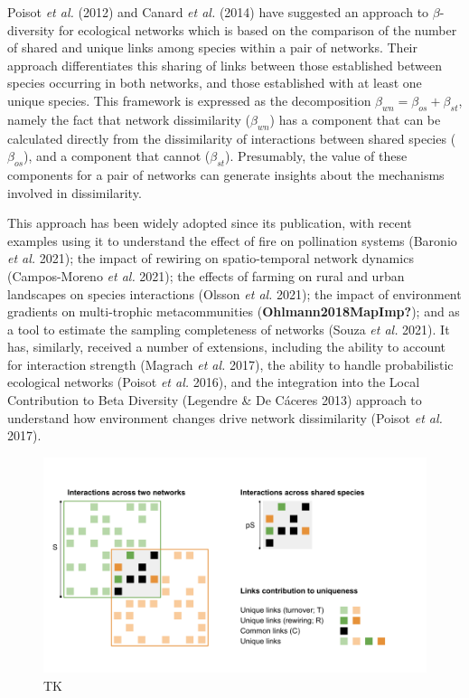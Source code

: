 \documentclass[11pt]{article}
\makeatletter
\def\maxwidth{\ifdim\Gin@nat@width>\linewidth\linewidth
\else\Gin@nat@width\fi}
\let\Oldincludegraphics\includegraphics
\renewcommand{\includegraphics}[1]{\Oldincludegraphics[width=\maxwidth]{#1}}
\makeatother
\begin{document}
Poisot \emph{et al.} (2012) and Canard \emph{et al.} (2014) have
suggested an approach to \(\beta\)-diversity for ecological networks
which is based on the comparison of the number of shared and unique
links among species within a pair of networks. Their approach
differentiates this sharing of links between those established between
species occurring in both networks, and those established with at least
one unique species. This framework is expressed as the decomposition
\(\beta_{wn} = \beta_{os} + \beta_{st}\), namely the fact that network
dissimilarity (\(\beta_{wn}\)) has a component that can be calculated
directly from the dissimilarity of interactions between shared species
(\(\beta_{os}\)), and a component that cannot (\(\beta_{st}\)).
Presumably, the value of these components for a pair of networks can
generate insights about the mechanisms involved in dissimilarity.

This approach has been widely adopted since its publication, with recent
examples using it to understand the effect of fire on pollination
systems (Baronio \emph{et al.} 2021); the impact of rewiring on
spatio-temporal network dynamics (Campos-Moreno \emph{et al.} 2021); the
effects of farming on rural and urban landscapes on species interactions
(Olsson \emph{et al.} 2021); the impact of environment gradients on
multi-trophic metacommunities (\textbf{Ohlmann2018MapImp?}); and as a
tool to estimate the sampling completeness of networks (Souza \emph{et
al.} 2021). It has, similarly, received a number of extensions,
including the ability to account for interaction strength (Magrach
\emph{et al.} 2017), the ability to handle probabilistic ecological
networks (Poisot \emph{et al.} 2016), and the integration into the Local
Contribution to Beta Diversity (Legendre \& De Cáceres 2013) approach to
understand how environment changes drive network dissimilarity (Poisot
\emph{et al.} 2017).

\begin{figure}
\hypertarget{fig:conceptual}{%
\centering
\includegraphics{figures/betadiv_response_figure.png}
\caption{TK}\label{fig:conceptual}
}
\end{figure}
\end{document}
